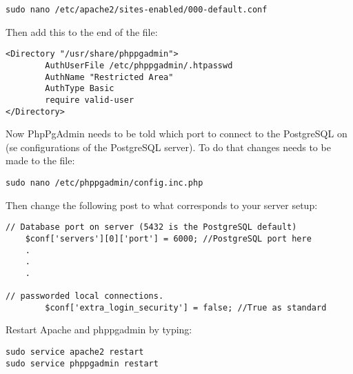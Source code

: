 \begin{verbatim}
sudo nano /etc/apache2/sites-enabled/000-default.conf
\end{verbatim}
Then add this to the end of the file:

\begin{verbatim}
<Directory "/usr/share/phppgadmin">
        AuthUserFile /etc/phppgadmin/.htpasswd
        AuthName "Restricted Area"
        AuthType Basic
        require valid-user
</Directory>

\end{verbatim}

Now PhpPgAdmin needs to be told which port to connect to the PostgreSQL on (se configurations of the PostgreSQL server). %
To do that changes needs to be made to the file:
\begin{verbatim}
sudo nano /etc/phppgadmin/config.inc.php
\end{verbatim}
Then change the following post to what corresponds to your server setup:
\begin{verbatim}
// Database port on server (5432 is the PostgreSQL default)
    $conf['servers'][0]['port'] = 6000; //PostgreSQL port here 
    .
    .
    .

// passworded local connections.
    	$conf['extra_login_security'] = false; //True as standard

\end{verbatim}




Restart Apache and phppgadmin by typing:
\begin{verbatim}
sudo service apache2 restart
sudo service phppgadmin restart
\end{verbatim}
